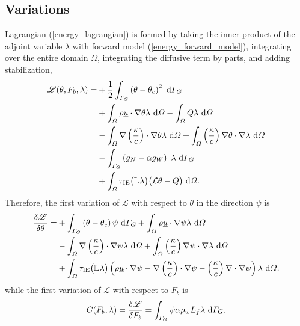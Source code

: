 \subsection{Variations}

Lagrangian (\ref{energy_lagrangian}) is formed by taking the inner product of the adjoint variable $\lambda$ with forward model (\ref{energy_forward_model}), integrating over the entire domain $\Omega$, integrating the diffusive term by parts, and adding stabilization,
\begin{align}
  \label{expanded_lagrangian}
  \mathscr{L}(\theta, F_b, \lambda) =
  &+ \frac{1}{2} \int_{\varGamma_G} \left( \theta - \theta_c \right)^2 \ \mathrm{d}\varGamma_G \notag \\ 
  &+ \int_{\varOmega} \rho \underline{u} \cdot \nabla \theta \lambda \ \mathrm{d}\varOmega - \int_{\varOmega} Q \lambda \ \mathrm{d}\varOmega \notag \\
  &- \int_{\varOmega} \nabla \left( \frac{\kappa}{c} \right) \cdot \nabla \theta \lambda \ \mathrm{d}\varOmega + \int_{\varOmega} \left( \frac{\kappa}{c} \right) \nabla \theta \cdot \nabla \lambda \ \mathrm{d}\varOmega \notag \\
  &- \int_{\varGamma_G} \left( g_N - \alpha g_W \right)\ \lambda \ \mathrm{d}\varGamma_G \notag \\
  &+ \int_{\varOmega} \tau_{\text{IE}} \big( \mathbb{L} \lambda \big) \big( \mathcal{L}\theta - Q \big) \ \mathrm{d}\varOmega.
\end{align}
Therefore, the first variation of $\mathscr{L}$ with respect to $\theta$ in the direction $\psi$ is
{\small
\begin{align}
 \label{dLdtheta}
 \frac{\delta \mathscr{L}}{\delta \theta} = 
 &+ \int_{\varGamma_G} \left( \theta - \theta_c \right) \psi \ \mathrm{d}\varGamma_G 
  + \int_{\varOmega} \rho \underline{u} \cdot \nabla \psi \lambda \ \mathrm{d}\varOmega \notag \\
  &- \int_{\varOmega} \nabla \left( \frac{\kappa}{c} \right) \cdot \nabla \psi \lambda \ \mathrm{d}\varOmega 
  + \int_{\varOmega} \left( \frac{\kappa}{c} \right) \nabla \psi \cdot \nabla \lambda \ \mathrm{d}\varOmega \notag \\
  &+ \int_{\varOmega} \tau_{\text{IE}} \big( \mathbb{L} \lambda \big) \left( \rho \underline{u} \cdot \nabla \psi - \nabla \left( \frac{\kappa}{c} \right) \cdot \nabla \psi - \left( \frac{\kappa}{c} \right) \nabla \cdot \nabla \psi \right) \lambda \ \mathrm{d}\varOmega.
\end{align}}
while the first variation of $\mathscr{L}$ with respect to $F_b$ is
\begin{align}
  \label{dLdFb}
  G(F_b, \lambda) = \frac{\delta \mathscr{L}}{\delta F_b}
  = \int_{\varGamma_G} \psi \alpha \rho_w L_f \lambda \ \mathrm{d}\varGamma_G.
\end{align}

